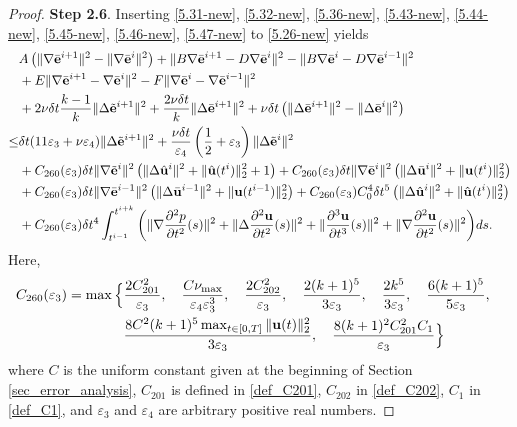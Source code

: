 \documentclass{article}
\theoremstyle{definition}                   %
\begin{document}
\begin{proof}
\vskip 0.2cm
{\bf Step 2.6}.
Inserting \eqref{5.31-new}, \eqref{5.32-new},
\eqref{5.36-new}, \eqref{5.43-new}, \eqref{5.44-new}, 
\eqref{5.45-new}, \eqref{5.46-new},
\eqref{5.47-new} to \eqref{5.26-new} yields
\begin{align}
&A\left(\|\nabla\bar{\bf{e}}^{i+1}\|^2 - \|\nabla\bar{\bf{e}}^i\|^2\right)
+ \|B\nabla\bar{\bf{e}}^{i+1} - D\nabla\bar{\bf{e}}^i\|^2
- \|B\nabla\bar{\bf{e}}^{i} - D\nabla\bar{\bf{e}}^{i-1}\|^2
\notag\\
&+E\|\nabla\bar{\bf{e}}^{i+1} - \nabla\bar{\bf{e}}^i \|^2
-F\|\nabla\bar{\bf{e}}^i - \nabla\bar{\bf{e}}^{i-1}\|^2
\notag\\
&
+2\nu\delta t \frac{k-1}{k} \|\Delta\tilde{\bf{e}}^{i+1}\|^2
+\frac{2\nu\delta t}{k} \|\Delta\bar{\bf{e}}^{i+1}\|^2
+\nu\delta t \left(\|\Delta\bar{\bf{e}}^{i+1}\|^2
 - \|\Delta\bar{\bf{e}}^i\|^2 \right) 
\notag\\
\le &
\delta t ( 11 \varepsilon_3 + \nu\varepsilon_4)
\|\Delta\tilde{\mathbf{e}}^{i+1} \|^2 
+ \frac{\nu\delta t}{\varepsilon_4} 
\left( \frac{1}{2} + \varepsilon_3 \right) 
 \|\Delta\tilde{\bf{e}}^i \|^2 
\notag\\
&+ 
C_{260}(\varepsilon_3) \delta t \|\nabla\tilde{\bf{e}}^i\|^2 
\left(\|\Delta\hat{\bf{u}}^i\|^2 + \|\hat{\bf{u}}(t^i)\|^2_2 + 1 \right)
+  
C_{260}(\varepsilon_3)  \delta t \|\nabla\bar{\bf{e}}^i\|^2 
\left(\|\Delta\bar{\bf{u}}^i\|^2 + \|{\bf{u}}(t^i)\|^2_2 \right)
\notag\\
&  + 
C_{260}(\varepsilon_3)  \delta t \|\nabla\bar{\bf{e}}^{i-1}\|^2 
\left(\|\Delta\bar{\bf{u}}^{i-1}\|^2 + \|{\bf{u}}(t^{i-1})\|^2_2 \right)
+
C_{260}(\varepsilon_3)  C^4_0\delta t^5 \left( \|\Delta\hat{\bf{u}}^i\|^2 
        + \|\hat{\bf{u}}(t^i)\|^2_2\right)
\notag\\
&+ C_{260}(\varepsilon_3)  \delta t^4 
\int_{t^{i-1}}^{t^{i+k}} 
\bigg(
\|\nabla \frac{\partial^2 p}{\partial t^2}(s)\|^2
+ \|\Delta \frac{\partial^2 {\bf{u}}}{\partial t^2}(s)\|^2
+ \| \frac{\partial^3 {\bf{u}}}{\partial t^3}(s)\|^2
+ \|\nabla \frac{\partial^2 {\bf{u}}}{\partial t^2}(s)\|^2
\bigg) ds.
\end{align}
Here,
\begin{align}
C_{260}(\varepsilon_3)
=\max\Big\{
& \frac{2C_{201}^2}{\varepsilon_3}, \quad
\frac{C \nu_{\max} }{\varepsilon_4 \varepsilon_3^3},\quad
\frac{2C_{202}^2}{\varepsilon_3},\quad
\frac{2(k+1)^5}{3\varepsilon_3},\quad
\frac{2k^5}{3\varepsilon_3},\quad
\frac{6(k+1)^5}{5\varepsilon_3},\quad
\notag\\
&\frac{8C^2 (k+1)^5 \max_{t\in[0,T]}\|{\bf u}(t)\|_2^2}{3\varepsilon_3},\quad
\frac{8 (k+1)^2 C_{201}^2 C_1}{\varepsilon_3}
\Big\}
\end{align}
where 
$C$ is the uniform constant given at the beginning of Section\,\ref{sec_error_analysis}, 
$C_{201}$ is defined in \eqref{def_C201},
$C_{202}$ in \eqref{def_C202}, 
$C_1$ in \eqref{def_C1}, and $\varepsilon_3$ and $\varepsilon_4$ are arbitrary positive real numbers. 




\end{proof}
\end{document}
